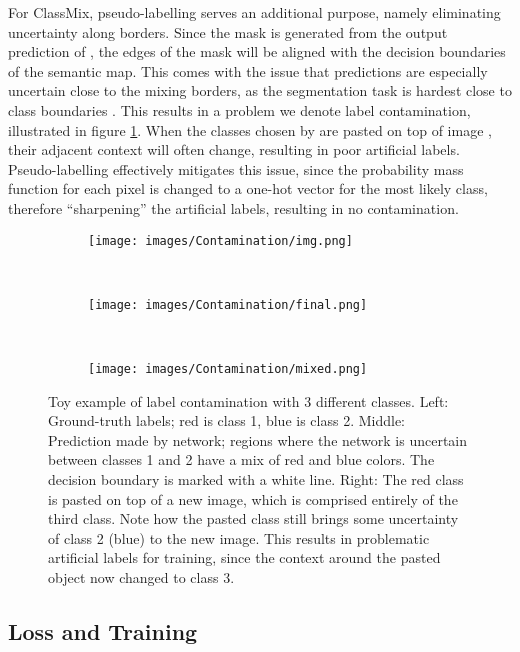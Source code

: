 \documentclass[10pt,twocolumn,letterpaper]{article}
\begin{document}
For ClassMix, pseudo-labelling serves an additional purpose, namely eliminating uncertainty along borders. Since the mask  is generated from the output prediction of , the edges of the mask will be aligned with the decision boundaries of the semantic map. This comes with the issue that predictions are especially uncertain close to the mixing borders, as the segmentation task is hardest close to class boundaries \cite{li2017pixels}. This results in a problem we denote label contamination, illustrated in figure \ref{fig:label_contamination}. When the classes chosen by  are pasted on top of image , their adjacent context will often change, resulting in poor artificial labels. Pseudo-labelling effectively mitigates this issue, since the probability mass function for each pixel is changed to a one-hot vector for the most likely class, therefore ``sharpening'' the artificial labels, resulting in no contamination.




\begin{figure}[tp!]
    \centering
    \begin{subfigure}[b]{0.3\columnwidth}
        \texttt{[image: images/Contamination/img.png]}
    \end{subfigure}
    ~
    \begin{subfigure}[b]{0.3\columnwidth}
        \texttt{[image: images/Contamination/final.png]}
    \end{subfigure}
    ~
    \begin{subfigure}[b]{0.3\columnwidth}
        \texttt{[image: images/Contamination/mixed.png]}
    \end{subfigure}
\caption{Toy example of label contamination with 3 different classes. Left: Ground-truth labels; red is class 1, blue is class 2. Middle: Prediction made by network; regions where the network is uncertain between classes 1 and 2 have a mix of red and blue colors. The decision boundary is marked with a white line. Right: The red class is pasted on top of a new image, which is comprised entirely of the third class. Note how the pasted class still brings some uncertainty of class 2 (blue) to the new image. This results in problematic artificial labels for training, since the context around the pasted object now changed to class 3.}
    \label{fig:label_contamination}
\end{figure}

\subsection{Loss and Training}
\end{document}
